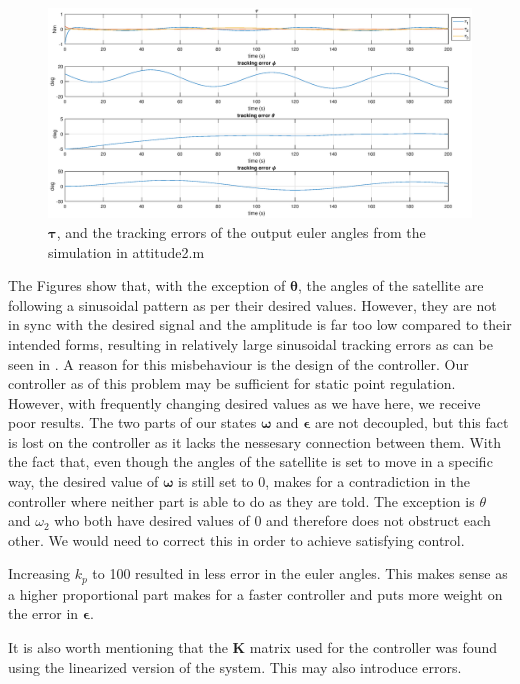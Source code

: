 \begin{figure}[!htb]
	\centering
	\includegraphics[width=1.00\textwidth]{figures/2_tau_track.eps}
	\caption{ $\boldsymbol{\tau}$, and the tracking errors of the output euler angles from the simulation in attitude2.m}
\label{fig:sim_attitude2_track}
\end{figure}


The Figures show that, with the exception of $\boldsymbol{\theta}$, the angles of the satellite are following a sinusoidal pattern as per their desired values. However, they are not in sync with the desired signal and the amplitude is far too low compared to their intended forms, resulting in relatively large sinusoidal tracking errors as can be seen in . A reason for this misbehaviour is the design of the controller. Our controller as of this problem may be sufficient for static point regulation. However, with frequently changing desired values as we have here, we receive poor results. The two parts of our states $\boldsymbol{\omega}$ and $\boldsymbol{\epsilon}$ are not decoupled, but this fact is lost on the controller as it lacks the nessesary connection between them. With the fact that, even though the angles of the satellite is set to move in a specific way, the desired value of $\boldsymbol{\omega}$ is still set to 0, makes for a contradiction in the controller where neither part is able to do as they are told. The exception is $\theta$ and $\omega_2$ who both have desired values of 0 and therefore does not obstruct each other. We would need to correct this in order to achieve satisfying control.

Increasing $k_p$ to 100 resulted in less error in the euler angles. This makes sense as a higher proportional part makes for a faster controller and puts more weight on the error in $\boldsymbol{\epsilon}$. 

It is also worth mentioning that the $\mathbf{K}$ matrix used for the controller was found using the linearized version of the system. This may also introduce errors.



